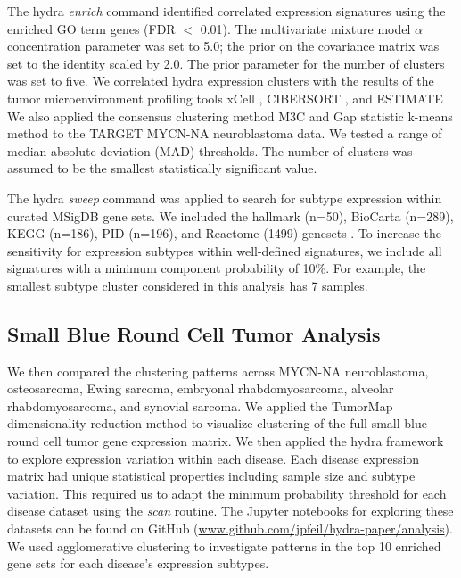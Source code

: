 \documentclass[10pt,letterpaper]{article}
\begin{document}
The hydra \textit{enrich} command identified correlated expression signatures using the enriched GO term genes (FDR $<$ 0.01). The multivariate mixture model $\alpha$ concentration parameter was set to 5.0; the prior on the covariance matrix was set to the identity scaled by 2.0. The prior parameter for the number of clusters was set to five. We correlated hydra expression clusters with the results of the tumor microenvironment profiling tools xCell \cite{aranXCellDigitallyPortraying2017}, CIBERSORT \cite{newmanRobustEnumerationCell2015}, and ESTIMATE \cite{yoshiharaInferringTumourPurity2013a}. We also applied the consensus clustering method M3C \cite{johnM3CMonteCarlo2018} and Gap statistic k-means method \cite{tibshirani2001estimating} to the TARGET MYCN-NA neuroblastoma data. We tested a range of median absolute deviation (MAD) thresholds. The number of clusters was assumed to be the smallest statistically significant value.

The hydra \textit{sweep} command was applied to search for subtype expression within curated MSigDB gene sets. We included the hallmark (n=50), BioCarta (n=289), KEGG (n=186), PID (n=196), and Reactome (1499) genesets \cite{liberzonMolecularSignaturesDatabase2011}. To increase the sensitivity for expression subtypes within well-defined signatures, we include all signatures with a minimum component probability of 10\%. For example, the smallest subtype cluster considered in this analysis has 7 samples. 

\subsection*{Small Blue Round Cell Tumor Analysis}
We then compared the clustering patterns across MYCN-NA neuroblastoma, osteosarcoma, Ewing sarcoma, embryonal rhabdomyosarcoma, alveolar rhabdomyosarcoma, and synovial sarcoma. We applied the TumorMap dimensionality reduction method \cite{newtonTumorMapExploringMolecular2017} to visualize clustering of the full small blue round cell tumor gene expression matrix. We then applied the hydra framework to explore expression variation within each disease. Each disease expression matrix had unique statistical properties including sample size and subtype variation. This required us to adapt the minimum probability threshold for each disease dataset using the \textit{scan} routine. The Jupyter notebooks for exploring these datasets can be found on GitHub (\url{www.github.com/jpfeil/hydra-paper/analysis}). We used agglomerative clustering to investigate patterns in the top 10 enriched gene sets for each disease's expression subtypes.
\end{document}
